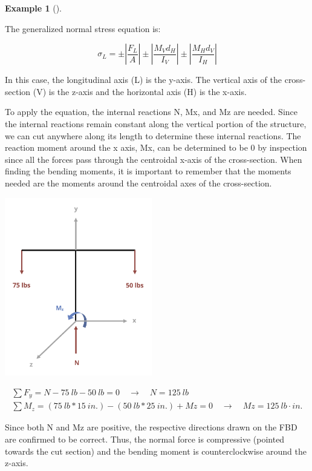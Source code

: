 \documentclass[
  letterpaper,
  DIV=11,
  numbers=noendperiod]{scrreprt}
\theoremstyle{definition}
\newtheorem{example}{Example}[chapter]
\theoremstyle{remark}
\begin{document}
\begin{tcolorbox}
\begin{example}[]
\begin{tcolorbox}
The generalized normal stress equation is:

\[
\sigma_L= \pm\left|\frac{F_L}{A}\right| \pm\left|\frac{M_V d_H}{I_V}\right| \pm\left|\frac{M_H d_V}{I_H}\right|
\]

In this case, the longitudinal axis (L) is the y-axis. The vertical axis
of the cross-section (V) is the z-axis and the horizontal axis (H) is
the x-axis.

To apply the equation, the internal reactions N, Mx, and Mz are needed.
Since the internal reactions remain constant along the vertical portion
of the structure, we can cut anywhere along its length to determine
these internal reactions. The reaction moment around the x axis, Mx, can
be determined to be 0 by inspection since all the forces pass through
the centroidal x-axis of the cross-section. When finding the bending
moments, it is important to remember that the moments needed are the
moments around the centroidal axes of the cross-section.

\begin{center}
\includegraphics[width=2.53125in,height=\textheight]{images/CH14 PNGs/exampe 14.2 part 2.png}
\end{center}

\[
\begin{gathered}
\sum F_y=N-75{~lb}-50{~lb}=0 \quad\rightarrow\quad N=125{~lb} \\
\sum M_z=(75{~lb}*15{~in.})-(50{~lb}*25{~in.})+M z=0 \quad\rightarrow\quad M z=125{~lb}\cdot{in.}
\end{gathered}
\]

Since both N and Mz are positive, the respective directions drawn on the
FBD are confirmed to be correct. Thus, the normal force is compressive
(pointed towards the cut section) and the bending moment is
counterclockwise around the z-axis.


\end{tcolorbox}
\end{example}
\end{tcolorbox}
\end{document}

